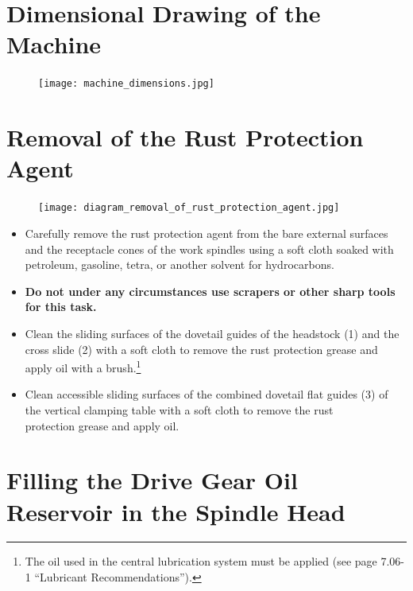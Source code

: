 \section{Dimensional Drawing of the Machine}

\begin{figure}[H]
    \centering
    \texttt{[image: machine\_dimensions.jpg]}
    \caption{}
    \label{fig:setup_plan_workspace_layout}
\end{figure}


\section{Removal of the Rust Protection Agent}

\setcounter{section}{8}


\begin{figure}[h]
    \centering
    \texttt{[image: diagram\_removal\_of\_rust\_protection\_agent.jpg]}
    \caption{}
\end{figure}

\begin{itemize}
    \item Carefully remove the rust protection agent from the bare external surfaces and the receptacle cones of the work spindles using a soft cloth soaked with petroleum, gasoline, tetra, or another solvent for hydrocarbons.
    \item \textbf{Do not under any circumstances use scrapers or other sharp tools for this task.}
    \item Clean the sliding surfaces of the dovetail guides of the headstock (1) and the cross slide (2) with a soft cloth to remove the rust protection grease and apply oil with a brush.\footnote{The oil used in the central lubrication system must be applied (see page 7.06-1 \enquote{Lubricant Recommendations}).}
    \item Clean accessible sliding surfaces of the combined dovetail flat guides (3) of the vertical clamping table with a soft cloth to remove the rust\\ protection grease and apply oil.
\end{itemize}


\section{Filling the Drive Gear Oil Reservoir in the Spindle Head}

